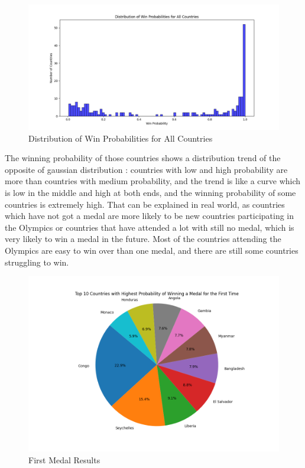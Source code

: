 \begin{figure}[h]
    \centering
    \includegraphics[width=1.1\textwidth]{../figures/win_probability_distribution.png}
    \caption{Distribution of Win Probabilities for All Countries}
    \label{fig:win_probability_distribution}
\end{figure}

The winning probability of those countries shows a distribution trend of the opposite of gaussian distribution : countries with low and high probability are more than countries with medium probability, and the trend is like a curve which is low in the middle and high at both ends, and the winning probability of some countries is extremely high. That can be explained in real world, as countries which have not got a medal are more likely to be new countries participating in the Olympics or countries that have attended a lot with still no medal, which is very likely to win a medal in the future. Most of the countries attending the Olympics are easy to win over than one medal, and there are still some countries struggling to win.
\begin{figure}[h]
    \centering
    \includegraphics[width=1.1\textwidth]{../figures/first_medal_pie.png}
    \caption{First Medal Results}
    \label{fig:first_medal_pie}
\end{figure}

